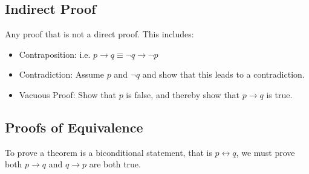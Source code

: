 \documentclass[12pt letter]{report}
\begin{document}
\subsection{Indirect Proof}

Any proof that is not a direct proof. This includes:

\begin{itemize}
	\item Contraposition: i.e. $p \to q \equiv \neg q \to \neg p$
	\item Contradiction: Assume $p$ and $\neg q$ and show that this leads to a contradiction.
	\item Vacuous Proof: Show that $p$ is false, and thereby show that $p \to q$ is true.
\end{itemize}



\subsection{Proofs of Equivalence}

To prove a theorem is a biconditional statement, that is $p \leftrightarrow q$, we must prove both $p \to q$ and $q \to
	p$ are both true.
\end{document}
